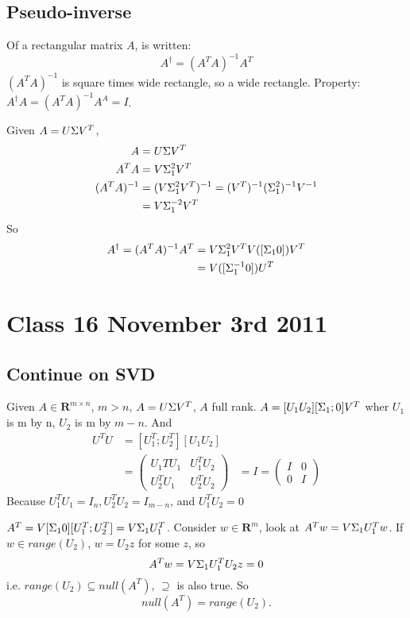 \subsection{Pseudo-inverse}
Of a rectangular matrix $A$, is written:
$$A^\dagger = (A^TA)^{-1}A^T$$
$(A^TA)^{-1}$ is square times wide rectangle, so a wide rectangle. 
Property: $A^\dag A = (A^TA)^{-1}A^A = I$.

Given $A = U\Sigma V^T$, 
\begin{align*}
  A &= U\Sigma V^T\\
A^TA &= V\Sigma_1^2 V^T\\
(A^TA)^{-1} &= (V\Sigma_1^2 V^T)^{-1} = (V^T)^{-1}(\Sigma_1^2)^{-1}V^{-1}\\
&=V\Sigma_1^{-2}V^T\\
\end{align*}
So 
\begin{align*}
A^\dagger = (A^TA)^{-1}A^T &= V\Sigma_1^2 V^T V([\Sigma_1 0]) V^T\\  
&=V([\Sigma_1^{-1} 0])U^T
\end{align*}

\section{Class 16 November 3rd 2011}
\label{sec:class16}

\subsection{Continue on SVD}
\label{sec:svd2}

Given $A\in \mathbf{R}^{m\times n}$, $m>n$, $A=U\Sigma V^T$, $A$ full
rank.
$A = [U_1 U_2][\Sigma_1 ; 0] V^T$ wher $U_1$ is m by n, $U_2$ is m by
$m-n$.
And
\begin{align*}
  U^TU &= [U_1^T; U_2^T][U_1 U_2]\\
&=
\begin{pmatrix}
U_1TU_1  & U_1^TU_2\\
U_2^TU_1 & U_2^TU_2
\end{pmatrix}
&=I =
\begin{pmatrix}
  I & 0 \\ 0 & I
\end{pmatrix}
\end{align*}
Because $U_1^TU_1 = I_n, U_2^TU_2 = I_{m-n}$, and $U_1^TU_2=0$

$A^T = V[\Sigma_1 0][U_1^T; U_2^T] = V\Sigma_1U_1^T$.
Consider $w\in \mathbf{R}^m$, look at $A^Tw = V\Sigma_1U_1^Tw$. If $w\in
range(U_2)$, $w = U_2z$ for some $z$, so
$$A^Tw = V\Sigma_1U_1^TU_2z = 0$$
i.e. $range(U_2) \subseteq null(A^T)$, $\supseteq$ is also true.
So $$null(A^T) = range(U_2).$$

